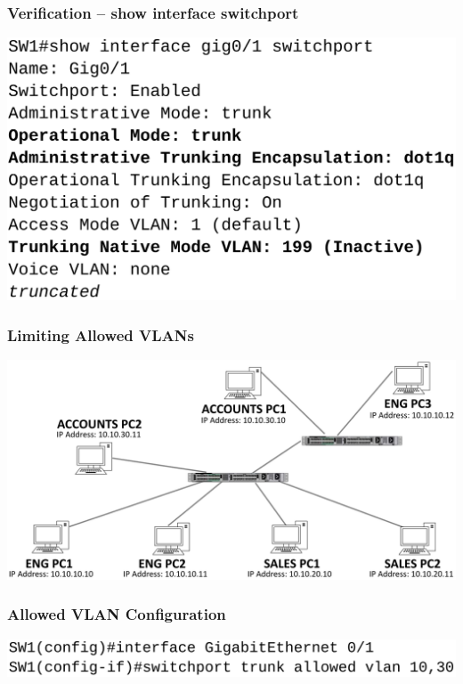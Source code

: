 \documentclass[pdflatex,compress,mathserif]{beamer}
\begin{document}
\begin{frame}
	\frametitle{Verification – show interface switchport}
	\begin{center}
		\includegraphics[width=\linewidth]{img/img29}
	\end{center}
\end{frame}

\begin{frame}
	\frametitle{Limiting Allowed VLANs}
	\begin{center}
		\includegraphics[width=\linewidth]{img/img30}
	\end{center}
\end{frame}

\begin{frame}
	\frametitle{Allowed VLAN Configuration}
	\begin{center}
		\includegraphics[width=\linewidth]{img/img31}
	\end{center}
\end{frame}
\end{document}
